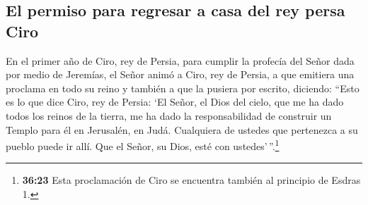 \hypertarget{el-permiso-para-regresar-a-casa-del-rey-persa-ciro}{%
\subsection{El permiso para regresar a casa del rey persa
Ciro}\label{el-permiso-para-regresar-a-casa-del-rey-persa-ciro}}

 En el primer año de Ciro, rey de Persia, para cumplir la
profecía del Señor dada por medio de Jeremías, el Señor animó a Ciro,
rey de Persia, a que emitiera una proclama en todo su reino y también a
que la pusiera por escrito, diciendo:  ``Esto es lo que
dice Ciro, rey de Persia: `El Señor, el Dios del cielo, que me ha dado
todos los reinos de la tierra, me ha dado la responsabilidad de
construir un Templo para él en Jerusalén, en Judá. Cualquiera de ustedes
que pertenezca a su pueblo puede ir allí. Que el Señor, su Dios, esté
con ustedes'\,''.\footnote{\textbf{36:23} Esta proclamación de Ciro se
  encuentra también al principio de Esdras 1.}
